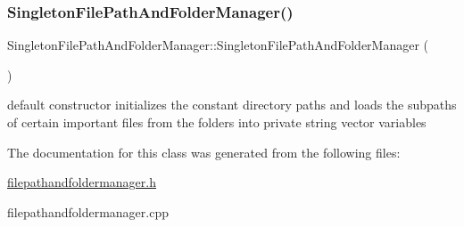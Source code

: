 \subsubsection{\texorpdfstring{Singleton\+File\+Path\+And\+Folder\+Manager()}{SingletonFilePathAndFolderManager()}}
{\footnotesize\ttfamily Singleton\+File\+Path\+And\+Folder\+Manager\+::\+Singleton\+File\+Path\+And\+Folder\+Manager (\begin{DoxyParamCaption}{ }\end{DoxyParamCaption})}

default constructor initializes the constant directory paths and loads the subpaths of certain important files from the folders into private string vector variables 

The documentation for this class was generated from the following files\+:\begin{DoxyCompactItemize}
\item 
\hyperlink{filepathandfoldermanager_8h}{filepathandfoldermanager.\+h}\item 
filepathandfoldermanager.\+cpp\end{DoxyCompactItemize}
